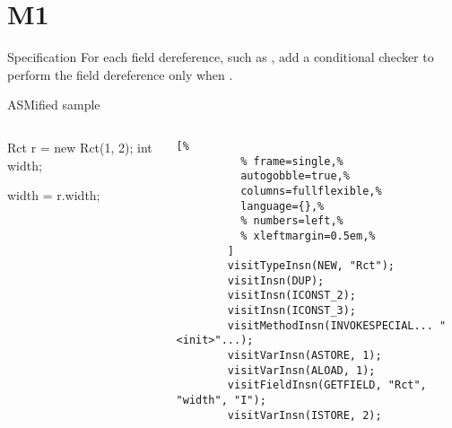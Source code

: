 \section{M1}

\begin{frame}{Specification}
  \justifying
  For each \alert<2>{field} dereference, such as , add a conditional checker to perform the field dereference only when .
\end{frame}

\begin{frame}[fragile]{ASMified sample}
  \begin{columns}
    \begin{column}{0.35\textwidth}
      \begin{Java}[%
        ]
        Rct r = new Rct(1, 2);
        int width;

        width = r.width;
      \end{Java}
    \end{column}
    \begin{column}{0.60\textwidth}
      \small
      \begin{lstlisting}[%
          % frame=single,%
          autogobble=true,%
          columns=fullflexible,%
          language={},%
          % numbers=left,%
          % xleftmargin=0.5em,%
        ]
        visitTypeInsn(NEW, "Rct");
        visitInsn(DUP);
        visitInsn(ICONST_2);
        visitInsn(ICONST_3);
        visitMethodInsn(INVOKESPECIAL... "<init>"...);
        visitVarInsn(ASTORE, 1);
        visitVarInsn(ALOAD, 1);
        visitFieldInsn(GETFIELD, "Rct", "width", "I");
        visitVarInsn(ISTORE, 2);
    \end{lstlisting}
    \end{column}
  \end{columns}
\end{frame}

